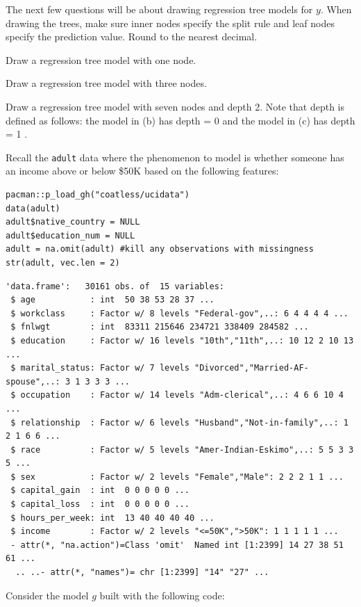 \documentclass[12pt]{article}
\begin{document}
The next few questions will be about drawing regression tree models for $y$. When drawing the trees, make sure inner nodes specify the split rule and leaf nodes specify the prediction value. Round to the nearest decimal.

 Draw a regression tree model with one node.

 Draw a regression tree model with three nodes.

 Draw a regression tree model with seven nodes and depth 2. Note that depth is defined as follows: the model in (b) has depth = 0 and the model in (c) has depth = 1 .


\eenum


\problem Recall the \texttt{adult} data where the phenomenon to model is whether someone has an income above or below \$50K based on the following features:

\begin{lstlisting}
pacman::p_load_gh("coatless/ucidata")
data(adult)
adult$native_country = NULL
adult$education_num = NULL
adult = na.omit(adult) #kill any observations with missingness
str(adult, vec.len = 2)
\end{lstlisting}

\vspace{-1cm}
\begin{verbatim}
'data.frame':	30161 obs. of  15 variables:
 $ age           : int  50 38 53 28 37 ...
 $ workclass     : Factor w/ 8 levels "Federal-gov",..: 6 4 4 4 4 ...
 $ fnlwgt        : int  83311 215646 234721 338409 284582 ...
 $ education     : Factor w/ 16 levels "10th","11th",..: 10 12 2 10 13 ...
 $ marital_status: Factor w/ 7 levels "Divorced","Married-AF-spouse",..: 3 1 3 3 3 ...
 $ occupation    : Factor w/ 14 levels "Adm-clerical",..: 4 6 6 10 4 ...
 $ relationship  : Factor w/ 6 levels "Husband","Not-in-family",..: 1 2 1 6 6 ...
 $ race          : Factor w/ 5 levels "Amer-Indian-Eskimo",..: 5 5 3 3 5 ...
 $ sex           : Factor w/ 2 levels "Female","Male": 2 2 2 1 1 ...
 $ capital_gain  : int  0 0 0 0 0 ...
 $ capital_loss  : int  0 0 0 0 0 ...
 $ hours_per_week: int  13 40 40 40 40 ...
 $ income        : Factor w/ 2 levels "<=50K",">50K": 1 1 1 1 1 ...
 - attr(*, "na.action")=Class 'omit'  Named int [1:2399] 14 27 38 51 61 ...
  .. ..- attr(*, "names")= chr [1:2399] "14" "27" ...
\end{verbatim}

\noindent Consider the model $g$ built with the following code:\\
\end{document}
